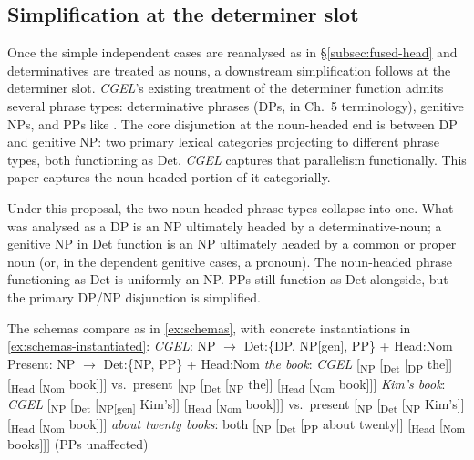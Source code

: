 \documentclass[12pt]{article}
\begin{document}
\subsection{Simplification at the determiner slot}\label{subsec:det-uniform}

Once the simple independent cases are reanalysed as in §\ref{subsec:fused-head} and determinatives are treated as nouns, a downstream simplification follows at the determiner slot. \textit{CGEL}'s existing treatment of the determiner function admits several phrase types: determinative phrases (DPs, in Ch.~5 terminology), genitive NPs, and PPs like  \citep[Ch.~5 §4-5]{huddleston2002}. The core disjunction at the noun-headed end is between DP and genitive NP: two primary lexical categories projecting to different phrase types, both functioning as Det. \textit{CGEL} captures that parallelism functionally. This paper captures the noun-headed portion of it categorially.

Under this proposal, the two noun-headed phrase types collapse into one. What was analysed as a DP is an NP ultimately headed by a determinative-noun; a genitive NP in Det function is an NP ultimately headed by a common or proper noun (or, in the dependent genitive cases, a pronoun). The noun-headed phrase functioning as Det is uniformly an NP. PPs still function as Det alongside, but the primary DP/NP disjunction is simplified.

The schemas compare as in \ref{ex:schemas}, with concrete instantiations in \ref{ex:schemas-instantiated}:
\ea\label{ex:schemas}
\ea \textit{CGEL}: NP $\rightarrow$ Det:\{DP, NP[gen], PP\} + Head:Nom
\ex Present: NP $\rightarrow$ Det:\{NP, PP\} + Head:Nom
\z
\z
\ea\label{ex:schemas-instantiated}
\ea \textit{the book}: \textit{CGEL} [\textsubscript{NP} [\textsubscript{Det} [\textsubscript{DP} the]] [\textsubscript{Head} [\textsubscript{Nom} book]]] vs.\ present [\textsubscript{NP} [\textsubscript{Det} [\textsubscript{NP} the]] [\textsubscript{Head} [\textsubscript{Nom} book]]]
\ex \textit{Kim's book}: \textit{CGEL} [\textsubscript{NP} [\textsubscript{Det} [\textsubscript{NP[gen]} Kim's]] [\textsubscript{Head} [\textsubscript{Nom} book]]] vs.\ present [\textsubscript{NP} [\textsubscript{Det} [\textsubscript{NP} Kim's]] [\textsubscript{Head} [\textsubscript{Nom} book]]]
\ex \textit{about twenty books}: both [\textsubscript{NP} [\textsubscript{Det} [\textsubscript{PP} about twenty]] [\textsubscript{Head} [\textsubscript{Nom} books]]] (PPs unaffected)
\z
\z
\end{document}
